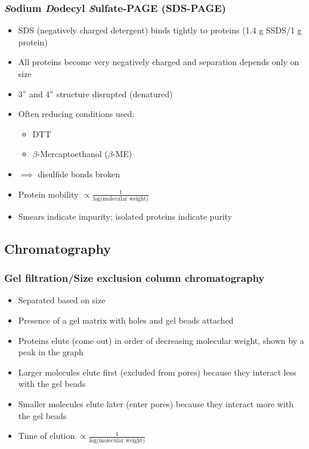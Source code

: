 \documentclass[letterpaper, 12pt]{article}
\begin{document}
\subsubsection*{\textit{S}odium \textit{D}odecyl \textit{S}ulfate-PAGE (SDS-PAGE)}

\begin{itemize}
\item SDS (negatively charged detergent) binds tightly to proteins (1.4 g SSDS/1 g protein)
\item All proteins become very negatively charged and separation depends only on size
\item 3$\degree$ and 4$\degree$ structure disrupted (denatured)
\item Often reducing conditions used: 
\begin{itemize}
\item DTT
\item $\beta$-Mercaptoethanol ($\beta$-ME)
\end{itemize}
\item $\implies$ disulfide bonds broken
\item Protein mobility $\displaystyle \propto \frac{1}{\log \text{(molecular weight)}}$
\item Smears indicate impurity; isolated proteins indicate purity
\end{itemize}

\subsection*{Chromatography}

\subsubsection*{Gel filtration/Size exclusion column chromatography}

\begin{itemize}
\item Separated based on size
\item Presence of a gel matrix with holes and gel beads attached
\item Proteins elute (come out) in order of decreasing molecular weight, shown by a peak in the graph
\item Larger molecules elute first (excluded from pores) because they interact less with the gel beads
\item Smaller molecules elute later (enter pores) because they interact more with the gel beads
\item Time of elution $\displaystyle \propto \frac{1}{\log \text{(molecular weight)}}$
\end{itemize}
\end{document}
